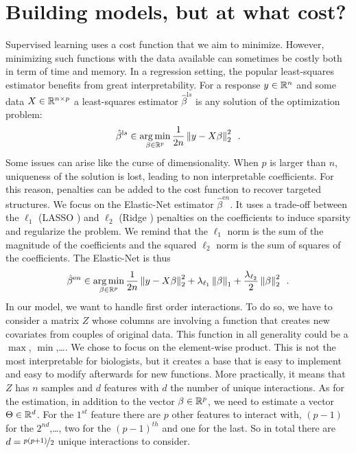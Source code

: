 \documentclass[../main.tex]{subfiles}
\begin{document}
\section{Building models, but at what cost?}
\label{sec:building_models_but_at_what_cost_}

Supervised learning uses a cost function that we aim to minimize.
However, minimizing such functions with the data available can sometimes be
costly both in term of time and memory.
In a regression setting, the popular least-squares estimator benefits from great
interpretability.
For a response $y\in\mathbb{R}^n$ and some data $X\in\mathbb{R}^{n\times p}$ a least-squares
estimator $\hat\beta^{\mathrm ls}$ is any solution of the optimization problem:
\begin{align*}
\hat\beta^{\mathrm ls}
\in
\mathop{\mathrm{arg\,min}}_{\beta\in\mathbb{R}^p}\frac{1}{2n}\left \lVert y-X\beta \right \rVert_2^2\enspace.
\end{align*}
Some issues can arise like the curse of dimensionality.
When $p$ is larger than $n$, uniqueness of the solution is lost,
leading to non interpretable coefficients.
For this reason, penalties can be added to the cost function to recover targeted
structures.
We focus on the Elastic-Net \citep{Zou_Hastie05} estimator $\hat\beta^{\mathrm en}$.
It uses a trade-off between the $\ell_1$ (LASSO \citep{Tibshirani96})
and $\ell_2$ (Ridge \citep{Tikhonov43}) penalties on the coefficients to induce
sparsity and regularize the problem.
We remind that the $\ell_1$ norm is the sum of the magnitude of the
coefficients and the squared $\ell_2$ norm is the sum of squares of the coefficients.
The Elastic-Net is thus
\begin{align}\label{eq:classic_enet}
\hat\beta^{\mathrm en}
\in
\mathop{\mathrm{arg\,min}}_{\beta \in \mathbb{R}^p}
 \frac{1}{2n} \left \lVert y - X\beta \right \rVert_2^2
+ \lambda_{\ell_1} \left \lVert \beta \right \rVert_1
+ \frac{\lambda_{\ell_2}}{2} \left \lVert \beta \right \rVert_2^2\enspace.
\end{align}
In our model, we want to handle first order interactions.
To do so, we have to consider a matrix $Z$ whose columns are involving a function
that creates new covariates from couples of original data.
This function in all generality could be a $\max$, $\min$,\dots.
We chose to focus on the element-wise product.
This is not the most interpretable for biologists, but it creates a base that is
easy to implement and easy to modify afterwards for new functions.
More practically, it means that $Z$ has $n$ samples and $d$ features with $d$
the number of unique interactions.
As for the estimation, in addition to the vector $\beta\in\mathbb{R}^p$, we need to
estimate a vector $\Theta\in\mathbb{R}^{d}$.
For the $1^{st}$ feature there are $p$ other features to interact with, $(p-1)$
for the $2^{nd}$,\dots, two for the $(p-1)^{th}$ and one for the last.
So in total there are $d=\nicefrac{p(p+1)}{2}$ unique interactions to consider.
\end{document}
